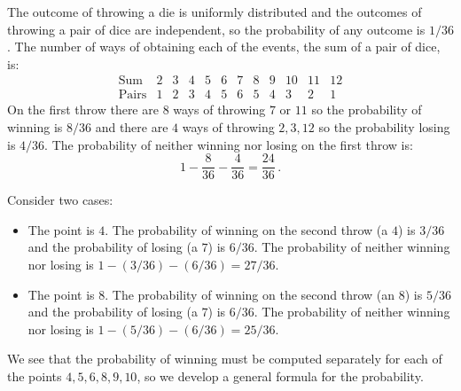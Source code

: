 
 The outcome of throwing a die is uniformly distributed and the outcomes of throwing a pair of dice are independent, so the probability of any outcome is $1/36$. The number of ways of obtaining each of the events, the sum of a pair of dice, is:
\[
\begin{array}{l|rrrrrrrrrrr}
\textrm{Sum} & 2 & 3 & 4 & 5 & 6 & 7 & 8 & 9 & 10 & 11 & 12\\\hline
\textrm{Pairs} & 1 & 2 & 3 & 4 & 5 & 6 & 5 & 4 & 3 & 2 & 1
\end{array}
\]
On the first throw there are $8$ ways of throwing $7$ or $11$ so the probability of winning is $8/36$ and there are $4$ ways of throwing $2,3,12$ so the probability losing is $4/36$. The probability of neither winning nor losing on the first throw is:
\[
1 - \frac{8}{36} - \frac{4}{36} = \frac{24}{36}\,.
\]


Consider two cases:
\begin{itemize}
\item The point is $4$. The probability of winning on the second throw (a $4$) is $3/36$ and the probability of losing (a $7$) is $6/36$. The probability of neither winning nor losing is $1-(3/36)-(6/36)=27/36$.
\item The point is $8$. The probability of winning on the second throw (an $8$) is $5/36$ and the probability of losing (a $7$) is $6/36$. The probability of neither winning nor losing is $1-(5/36)-(6/36)=25/36$.
\end{itemize}
We see that the probability of winning must be computed separately for each of the points $4,5,6,8,9,10$, so we develop a general formula for the probability.

